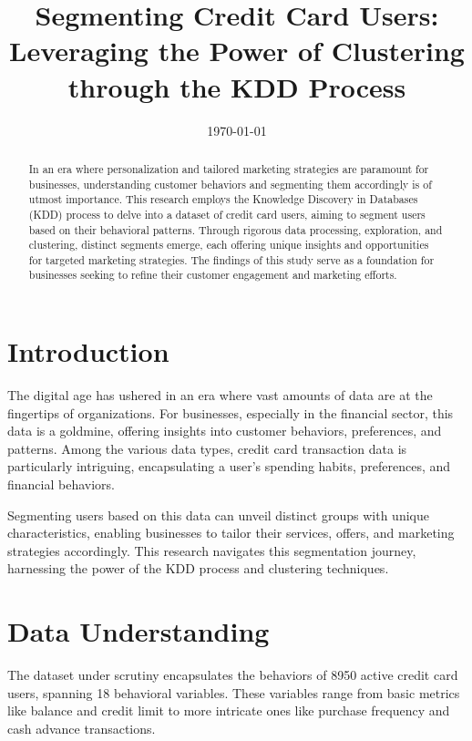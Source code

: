 \documentclass[12pt]{article}
\title{Segmenting Credit Card Users: \\ Leveraging the Power of Clustering through the KDD Process}
\date{\today}
\begin{document}
\maketitle

\begin{abstract}
In an era where personalization and tailored marketing strategies are paramount for businesses, understanding customer behaviors and segmenting them accordingly is of utmost importance. This research employs the Knowledge Discovery in Databases (KDD) process to delve into a dataset of credit card users, aiming to segment users based on their behavioral patterns. Through rigorous data processing, exploration, and clustering, distinct segments emerge, each offering unique insights and opportunities for targeted marketing strategies. The findings of this study serve as a foundation for businesses seeking to refine their customer engagement and marketing efforts.
\end{abstract}

\section{Introduction}

The digital age has ushered in an era where vast amounts of data are at the fingertips of organizations. For businesses, especially in the financial sector, this data is a goldmine, offering insights into customer behaviors, preferences, and patterns. Among the various data types, credit card transaction data is particularly intriguing, encapsulating a user's spending habits, preferences, and financial behaviors.

Segmenting users based on this data can unveil distinct groups with unique characteristics, enabling businesses to tailor their services, offers, and marketing strategies accordingly. This research navigates this segmentation journey, harnessing the power of the KDD process and clustering techniques.

\section{Data Understanding}

The dataset under scrutiny encapsulates the behaviors of 8950 active credit card users, spanning 18 behavioral variables. These variables range from basic metrics like balance and credit limit to more intricate ones like purchase frequency and cash advance transactions.
\end{document}
